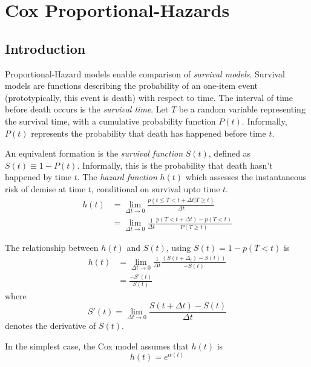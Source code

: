 
\chapter[Cox Proportional-Hazards]{Cox Proportional-Hazards}

\section{Introduction}
Proportional-Hazard models enable comparison of \textit{survival models}.
Survival models are functions describing the probability of an one-item event
(prototypically, this event is death) with respect to time.  The interval of
time before death occurs is the \textit{survival time}.   Let $T$ be a random
variable representing the survival time, with a cumulative probability function
$P(t)$.  Informally, $P(t)$ represents the probability that death has happened
before time $t$.

An equivalent formation is the \textit{survival function} $S(t)$, defined as
$S(t) \equiv 1 - P(t)$.  Informally, this is the probability that death hasn't
happened by time $t$.  The \textit{hazard function} $h(t)$ which assesses the
instantaneous risk of demise at time $t$, conditional on survival upto time $t$.
\begin{align}
    h(t) &= \lim_{\Delta t \rightarrow 0} \frac{p\left(t \le T < t + \Delta t | T \ge t \right)}
                                              {\Delta t} \\
         &= \lim_{\Delta t \rightarrow 0}  \frac{1}{\Delta t}\frac{p(T < t + \Delta t) - p(T < t)}{P(T \ge t)}
\end{align}

The relationship between $h(t)$ and $S(t)$, using $S(t) = 1 - p(T < t)$ is
\begin{align}
h(t) & = \lim_{\Delta t \rightarrow 0}  \frac{1}{\Delta t} \frac{\left(S(t + \Delta_t) - S(t)\right)}{-S(t)}\\
     & = \frac{-S'(t)}{S(t)}
\end{align}
where
$$S'(t) = \lim_{\Delta t \rightarrow 0}  \frac{S(t + \Delta t) - S(t)}{\Delta t}$$
denotes the derivative of $S(t)$.

In the simplest case, the Cox model assumes that $h(t)$ is
\begin{equation}
h(t) = e^{\alpha(t)}
\end{equation}

